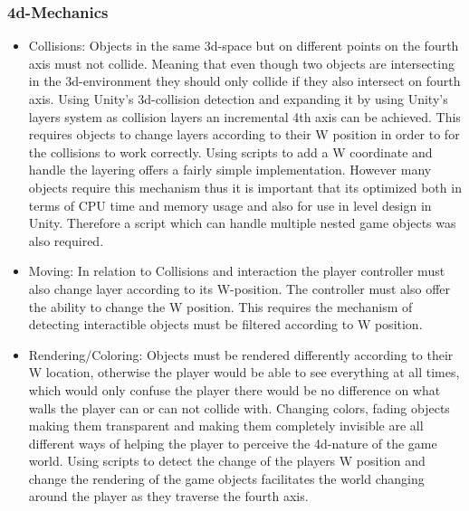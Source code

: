 \subsubsection{4d-Mechanics}
\begin{itemize}
	\item Collisions: Objects in the same 3d-space but on different points on the fourth axis must not collide. Meaning that even though two objects are intersecting in the 3d-environment they should only collide if they also intersect on fourth axis. Using Unity's 3d-collision detection and expanding it by using Unity's layers system as collision layers an incremental 4th axis can be achieved. This requires objects to change layers according to their W position in order to for the collisions to work correctly. Using scripts to add a W coordinate and handle the layering offers a fairly simple implementation. However many objects require this mechanism thus it is important that its optimized both in terms of CPU time and memory usage and also for use in level design in Unity. Therefore a script which can handle multiple nested game objects was also required. 
	\item Moving: In relation to Collisions and interaction the player controller must also change layer according to its W-position. The controller must also offer the ability to change the W position. This requires the mechanism of detecting interactible objects must be filtered according to W position. 
	\item Rendering/Coloring: Objects must be rendered differently according to their W location, otherwise the player would be able to see everything at all times, which would only confuse the player there would be no difference on what walls the player can or can not collide with. Changing colors, fading objects making them transparent and making them completely invisible are all different ways of helping the player to perceive the 4d-nature of the game world. Using scripts to detect the change of the players W position and change the rendering of the game objects facilitates the world changing around the player as they traverse the fourth axis.
\end{itemize}

